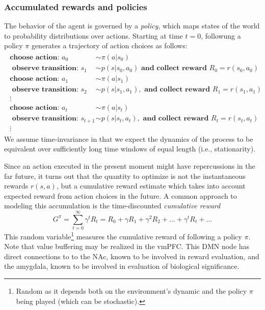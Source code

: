 \documentclass[10pt,letterpaper]{article}
\begin{document}
\subsubsection{Accumulated rewards and policies}
The behavior of the agent is governed by a \textit{policy}, which maps states of the world
to probability distributions over actions. Starting at time $t=0$,
followung a policy $\pi$ generates a trajectory of action choices as follows:
\begin{eqnarray*}
  \begin{split}
    \textbf{choose action: }a_0 &\sim \pi(a|s_0)\\
    \textbf{ observe transition: }s_1 &\sim p(s|s_0,a_0)\textbf{ and collect reward }R_0 = r(s_0, a_0)\\
    \textbf{choose action: }a_1 &\sim \pi(a|s_1)\\
    \textbf{ observe transition: }s_2 &\sim p(s|s_1,a_1), \textbf{ and collect reward }R_1 = r(s_1, a_1)\\
    \vdots\\
    \textbf{choose action: }a_{t} &\sim \pi(a|s_{t})\\
    \textbf{ observe transition: }s_{t+1} &\sim p(s|s_{t},a_{t}), \textbf{ and collect reward }R_{t} = r(s_{t}, a_{t})\\
    \vdots
  \end{split}
\end{eqnarray*}
We assume time-invariance
in that we expect the dynamics of the process
to be equivalent over sufficiently long time windows of equal length (i.e., stationarity).



Since an action executed in the present moment might have repercussions in the far future, it turns out that the
quantity to optimize is not the instantaneous rewards $r(s, a)$, but a
cumulative reward estimate which takes into account expected reward
from action choices in the future.
A common approach to
modeling this accumulation is the time-discounted \textit{cumulative reward}%
\begin{equation}
  \label{eq:cumr}
  G^\pi = \sum_{t=0}^{\infty}\gamma^{t}R_t = R_0 + \gamma R_1 + \gamma^2 R_2 + \ldots + \gamma^tR_t + \ldots
\end{equation}
This random variable\footnote{Random as it depends both on the environment's dynamic and the
  policy $\pi$ being played (which can be stochastic).}  measures the cumulative reward of
following a policy $\pi$.
%
Note that value buffering may be realized in the vmPFC.
This DMN node has direct connections to
to the NAc, known to be involved in reward evaluation,
and
the amygdala, known to be involved in evaluation of biological significance.
\end{document}
